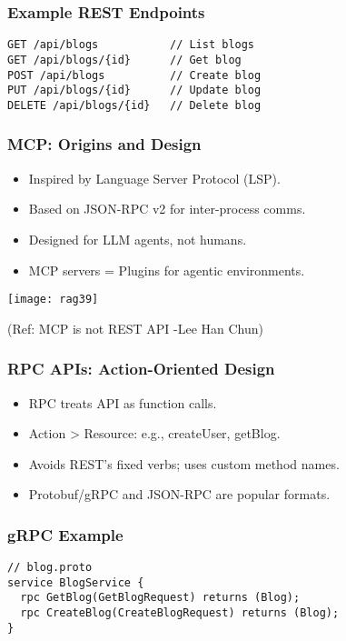 \begin{frame}[fragile]\frametitle{Example REST Endpoints}
\begin{lstlisting}
GET /api/blogs           // List blogs
GET /api/blogs/{id}      // Get blog
POST /api/blogs          // Create blog
PUT /api/blogs/{id}      // Update blog
DELETE /api/blogs/{id}   // Delete blog
\end{lstlisting}
\end{frame}

\begin{frame}[fragile]\frametitle{MCP: Origins and Design}
\begin{itemize}
  \item Inspired by Language Server Protocol (LSP).
  \item Based on JSON-RPC v2 for inter-process comms.
  \item Designed for LLM agents, not humans.
  \item MCP servers = Plugins for agentic environments.
\end{itemize}

	\begin{center}
	\texttt{[image: rag39]}

	{\tiny (Ref: MCP is not REST API -Lee Han Chun)}
	\end{center}
		
\end{frame}

\begin{frame}[fragile]\frametitle{RPC APIs: Action-Oriented Design}
\begin{itemize}
  \item RPC treats API as function calls.
  \item Action > Resource: e.g., createUser, getBlog.
  \item Avoids REST’s fixed verbs; uses custom method names.
  \item Protobuf/gRPC and JSON-RPC are popular formats.
\end{itemize}
\end{frame}

\begin{frame}[fragile]\frametitle{gRPC Example}
\begin{lstlisting}
// blog.proto
service BlogService {
  rpc GetBlog(GetBlogRequest) returns (Blog);
  rpc CreateBlog(CreateBlogRequest) returns (Blog);
}
\end{lstlisting}
\end{frame}

